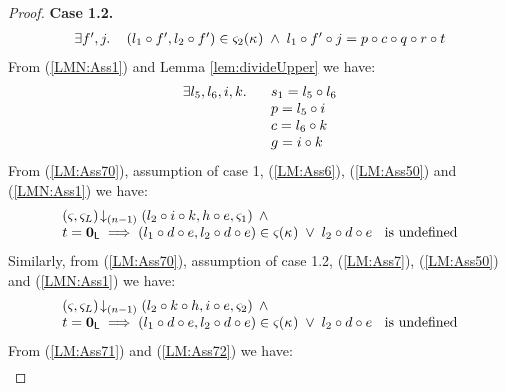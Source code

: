 \begin{lemma}[]
\begin{proof}
\noindent\textbf{Case 1.2.}
\[
\begin{array}{l l}
	\exists f', j.\,& (l_1 \circ f', l_2 \circ f') \in \varsigma_{2}(\kappa_{}) \;\land\; l_1 \circ f' \circ j = p \circ c \circ q \circ r \circ t\\
\end{array}
\]
%
%
From (\ref{LMN:Ass1}) and Lemma \ref{lem:divideUpper} we have:
%
\begin{align}
	\begin{array}{l l}
		\exists l_5, l_6, i, k.\, \hspace*{0.2cm} & s_1 = l_5 \circ l_6 \\
		& p = l_5 \circ i\\
		& c = l_6 \circ k\\
		& g = i \circ k
	\end{array} \label{LM:Ass70}
\end{align} 
%
From (\ref{LM:Ass70}), assumption of case 1, (\ref{LM:Ass6}), (\ref{LM:Ass50}) and (\ref{LMN:Ass1}) we have:
%
%
\begin{align}
	\begin{array}{l}
		\left(\varsigma_{}, \varsigma_{L}\right) \!\downarrow_{(n-1)} \left(l_2 \circ i \circ k, h \circ e, \varsigma_{1}\right) \;\land		\\
		t = \mathbf{0}_{\textsf{L}} \implies (l_1 \circ d \circ e, l_2 \circ d \circ e) \in \varsigma_{}(\kappa_{}) \;\lor\; l_2 \circ d \circ e \hspace*{0.2cm}\text{ is undefined}
	\end{array} \label{LM:Ass71}
\end{align}
Similarly, from (\ref{LM:Ass70}), assumption of case 1.2, (\ref{LM:Ass7}), (\ref{LM:Ass50}) and (\ref{LMN:Ass1}) we have:
%
\begin{align}
	\begin{array}{l}
		\left(\varsigma_{}, \varsigma_{L}\right) \!\downarrow_{(n-1)} \left(l_2 \circ k \circ h, i \circ e, \varsigma_{2}\right) \;\land\\
		t = \mathbf{0}_{\textsf{L}} \implies (l_1 \circ d \circ e, l_2 \circ d \circ e) \in \varsigma_{}(\kappa_{}) \;\lor\; l_2 \circ d \circ e \hspace*{0.2cm}\text{ is undefined}
	\end{array} \label{LM:Ass72}
\end{align}
From (\ref{LM:Ass71}) and (\ref{LM:Ass72}) we have:
%
\begin{align}

\end{align}
\end{proof}
\end{lemma}
